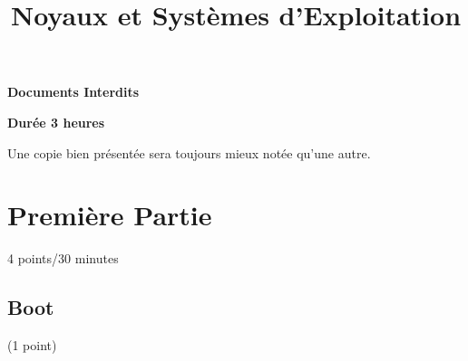 %
%
%
%
%
%

%
%

%
%

\def\path{../../..}

%
%



%
%

\title{Noyaux et Syst\`emes d'Exploitation}

%
%


%
%



%
%

\maketitle

%
%

\indentation{}

%
%

\begin{center}

\textbf{Documents Interdits}

\textbf{Dur\'ee 3 heures}

\scriptsize{Une copie bien pr\'esent\'ee sera toujours mieux not\'ee
            qu'une autre.}

\end{center}

%
%

%
%

\section{Premi\`ere Partie}
{\hfill{} \scriptsize{4 points/30 minutes}}
\subsection{Boot} (1 point)

